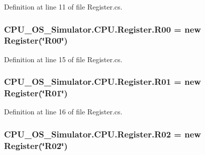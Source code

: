 Definition at line 11 of file Register.\+cs.

\hypertarget{class_c_p_u___o_s___simulator_1_1_c_p_u_1_1_register_a14dd660fd5c709aa90298e0716d8b88a}{}
\subsubsection[{R00}]{ C\+P\+U\+\_\+\+O\+S\+\_\+\+Simulator.\+C\+P\+U.\+Register.\+R00 = new {\bf Register}(\char`\"{}R00\char`\"{})\hspace{0.3cm}{\ttfamily [static]}}\label{class_c_p_u___o_s___simulator_1_1_c_p_u_1_1_register_a14dd660fd5c709aa90298e0716d8b88a}


Definition at line 15 of file Register.\+cs.

\hypertarget{class_c_p_u___o_s___simulator_1_1_c_p_u_1_1_register_a8e2da18c4d80597ebe22c0cdd23d5211}{}
\subsubsection[{R01}]{ C\+P\+U\+\_\+\+O\+S\+\_\+\+Simulator.\+C\+P\+U.\+Register.\+R01 = new {\bf Register}(\char`\"{}R01\char`\"{})\hspace{0.3cm}{\ttfamily [static]}}\label{class_c_p_u___o_s___simulator_1_1_c_p_u_1_1_register_a8e2da18c4d80597ebe22c0cdd23d5211}


Definition at line 16 of file Register.\+cs.

\hypertarget{class_c_p_u___o_s___simulator_1_1_c_p_u_1_1_register_a80b13ce612c017c483a1a4edfecd6d99}{}
\subsubsection[{R02}]{ C\+P\+U\+\_\+\+O\+S\+\_\+\+Simulator.\+C\+P\+U.\+Register.\+R02 = new {\bf Register}(\char`\"{}R02\char`\"{})\hspace{0.3cm}{\ttfamily [static]}}\label{class_c_p_u___o_s___simulator_1_1_c_p_u_1_1_register_a80b13ce612c017c483a1a4edfecd6d99}


